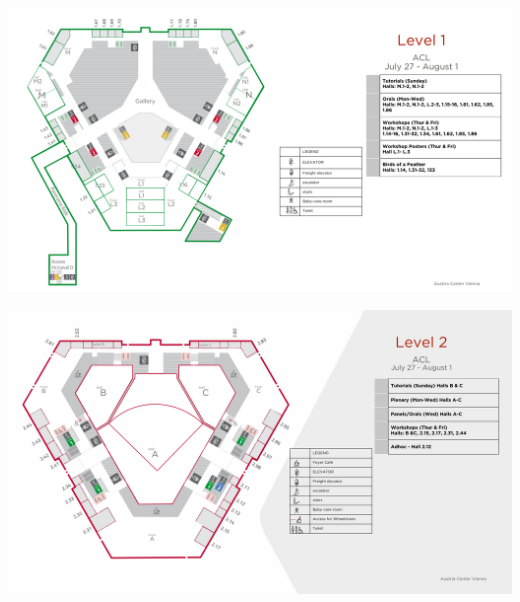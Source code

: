 \begin{center}
\includegraphics[height=0.82\linewidth, angle=90]{examples/acl25-handbook/venue_map/acl25_map-3.pdf}
\end{center}

\begin{center}
\includegraphics[height=0.82\linewidth, angle=90]{examples/acl25-handbook/venue_map/acl25_map-4.pdf}
\end{center}